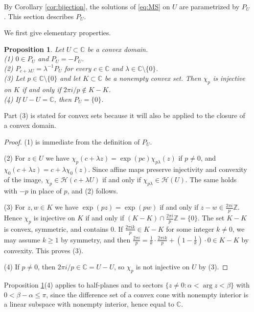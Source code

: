 \documentclass[a4paper, reqno, 11pt]{amsart}
\newtheorem{Prop}[Thm]{Proposition}
\theoremstyle{definition}
\begin{document}
By Corollary \ref{cor:bijection}, the solutions of \eqref{eq:MS} on $U$ are parametrized by $P_U$.
This section describes $P_U$.


We first give elementary properties. 

\begin{Prop}\label{prop:basic}
Let $U \subset \mathbb{C}$ be a convex domain. \\
(1) $0 \in P_U$ and $P_U = -P_U$. \\
(2) $P_{c + \lambda U} = \lambda^{-1} P_U$ for every $c \in \mathbb{C}$ and $\lambda \in \mathbb{C}\setminus\{0\}$. \\
(3) Let $p \in \mathbb{C}\setminus\{0\}$ and let $K \subset \mathbb{C}$ be a nonempty convex set. Then $\chi_p$ is injective on $K$ if and only if $2\pi i/p \notin K - K$. \\
(4) If $U - U = \mathbb{C}$, then $P_U = \{0\}$.
\end{Prop}

Part (3) is stated for convex sets because it will also be applied to the closure of a convex domain.

\begin{proof}
(1) is immediate from the definition of $P_U$. 

(2) For $z \in U$ we have $\chi_p(c + \lambda z) = \exp(pc) \chi_{p\lambda}(z)$ if $p \neq 0$, and $\chi_0(c + \lambda z) = c + \lambda \chi_0(z)$.
Since affine maps preserve injectivity and convexity of the image, $\chi_p \in \mathcal{H}(c + \lambda U)$ if and only if $\chi_{p\lambda} \in \mathcal{H}(U)$.
The same holds with $-p$ in place of $p$, and (2) follows.

(3) For $z, w \in K$ we have $\exp(pz) = \exp(pw)$ if and only if $z - w \in \frac{2\pi i}{p} \mathbb{Z}$.
Hence $\chi_p$ is injective on $K$ if and only if $(K - K) \cap \frac{2\pi i}{p}\mathbb{Z} = \{0\}$.
The set $K - K$ is convex, symmetric, and contains $0$.
If $\frac{2\pi i k}{p} \in K - K$ for some integer $k \neq 0$, we may assume $k \ge  1$ by symmetry, and then $\frac{2\pi i}{p} = \frac{1}{k} \cdot \frac{2\pi i k}{p} + \left( 1 - \frac{1}{k} \right) \cdot 0 \in K - K$ by convexity.
This proves (3).

(4) If $p \neq 0$, then $2\pi i/p \in \mathbb{C} = U - U$, so $\chi_p$ is not injective on $U$ by (3).
\end{proof}

Proposition \ref{prop:basic}(4) applies to half-planes and to sectors $\{ z \neq 0 : \alpha < \arg z < \beta \}$ with $0 < \beta - \alpha \le  \pi$, since the difference set of a convex cone with nonempty interior is a linear subspace with nonempty interior, hence equal to $\mathbb{C}$.
\end{document}
